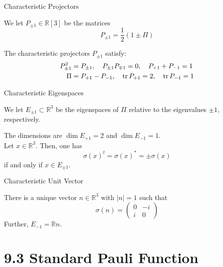\begin{frame}{Characteristic Projectors}
    \begin{definition}[9.2.1]
        We let $P_{\pm 1} \in \mathbb{R}[3]$ be the matrices
        \[ P_{\pm 1} = \frac{1}{2}(1 \pm \Pi) \]
    \end{definition}

    \begin{proposition}[9.2.2]
        The characteristic projectors $P_{\pm 1}$ satisfy:
        \begin{align*}
            P_{\pm 1}^2 & = P_{\pm 1}, \quad P_{\pm 1}P_{\mp 1} = 0, \quad P_{+1} + P_{-1} = 1 \\
            \Pi         & = P_{+1} - P_{-1}, \quad \tr P_{+1} = 2, \quad \tr P_{-1} = 1
        \end{align*}
    \end{proposition}
\end{frame}

\begin{frame}{Characteristic Eigenspaces}
    \begin{definition}[9.2.2]
        We let $E_{\pm 1} \subset \mathbb{R}^3$ be the eigenspaces of $\Pi$ relative to the eigenvalues $\pm 1$, respectively.
    \end{definition}

    \begin{proposition}[9.2.3 \& 9.2.4]
        The dimensions are $\dim E_{+1} = 2$ and $\dim E_{-1} = 1$. \\
        Let $x \in \mathbb{R}^3$. Then, one has
        \[ \sigma(x)^t = \sigma(x)^* = \pm \sigma(x) \]
        if and only if $x \in E_{\pm 1}$.
    \end{proposition}
\end{frame}

\begin{frame}{Characteristic Unit Vector}
    \begin{proposition}[9.2.5]
        There is a unique vector $n \in \mathbb{R}^3$ with $|n| = 1$ such that
        \[ \sigma(n) = \begin{pmatrix} 0 & -i \\ i & 0 \end{pmatrix} \]
        Further, $E_{-1} = \mathbb{R}n$.
    \end{proposition}
\end{frame}

\section{9.3 Standard Pauli Function}

